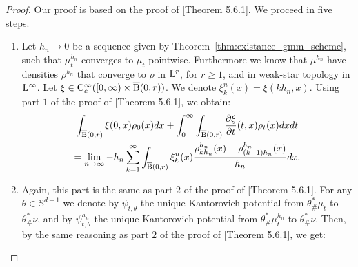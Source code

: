 \begin{proof}
Our proof is based on the proof of \cite{bonnotte2013unidimensional}[Theorem 5.6.1]. We proceed in five steps.

\begin{enumerate}[wide, labelwidth=!, labelindent=0pt,label=(\arabic*)]
\item Let $h_n \rightarrow 0$ be a sequence given by Theorem~\ref{thm:existance_gmm_scheme}, such that $\mu_t^{h_n}$ converges to $\mu_t$ pointwise. Furthermore we know that $\mu^{h_n}$ have densities $\rho^{h_n}$ that converge to $\rho$ in $\mathrm{L}^r$, for $r \geq 1$, and in weak-star topology in $\mathrm{L}^{\infty}$. Let $\xi \in \mathrm{C}_c^{\infty} ([0, \infty) \times \operatorname{\overline{B}}(0,r))$. We denote $\xi_{k}^n(x)  = \xi(kh_n, x)$. Using part $1$ of the proof of  \cite{bonnotte2013unidimensional}[Theorem 5.6.1], we obtain:
\begin{multline} \label{thm:cont_proof_part1}
\int_{\operatorname{\overline{B}}(0,r)} \xi(0, x) \rho_0(x) dx + \int_0^{\infty} \int_{\operatorname{\overline{B}}(0,r)} \frac{\partial \xi}{\partial t}(t,x) \rho_t(x) dx dt \\
= \lim_{n \rightarrow \infty} - h_n \sum_{k=1}^{\infty} \int_{\operatorname{\overline{B}}(0,r)} \xi_k^n(x) \frac{\rho_{kh_n}^{h_n}(x) - \rho_{(k-1)h_n}^{h_n}(x) }{h_n} dx.
\end{multline}
\item Again, this part is the same as part $2$ of the proof of  \cite{bonnotte2013unidimensional}[Theorem 5.6.1]. For any $\theta \in \mathbb{S}^{d-1}$ we denote by $\psi_{t, \theta}$ the unique Kantorovich potential from $\theta_{\#}^{*}\mu_t$ to $\theta_{\#}^{*}\nu$, and by $\psi_{t, \theta}^{h_n}$ the unique Kantorovich potential from $\theta_{\#}^{*} \mu_t^{h_n}$ to $\theta_{\#}^{*} \nu$. Then, by the same reasoning as part $2$ of the proof of  \cite{bonnotte2013unidimensional}[Theorem 5.6.1], we get:


\end{enumerate}
\end{proof}
